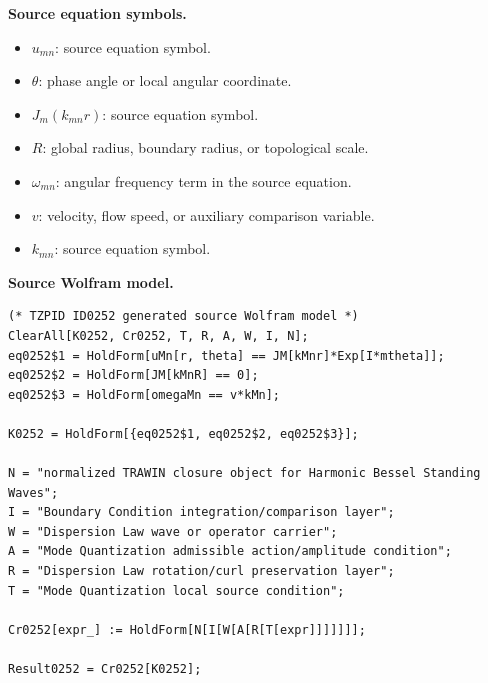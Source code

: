 \begin{minipage}[t]{0.49\linewidth}
\begingroup
\small
\raggedright
\textbf{Source equation symbols.}\par
\begin{itemize}[leftmargin=1.35em,itemsep=1pt,topsep=1pt,parsep=0pt]
    \item $u_{mn}$: source equation symbol.
    \item $\theta$: phase angle or local angular coordinate.
    \item $J_m(k_{mn}r)$: source equation symbol.
    \item $R$: global radius, boundary radius, or topological scale.
    \item $\omega_{mn}$: angular frequency term in the source equation.
    \item $v$: velocity, flow speed, or auxiliary comparison variable.
    \item $k_{mn}$: source equation symbol.
\end{itemize}
\endgroup
\end{minipage}\hfill
\begin{minipage}[t]{0.47\linewidth}
\begingroup
\scriptsize
\raggedright
\textbf{Source Wolfram model.}\par
\begin{Verbatim}[fontsize=\tiny,breaklines=true,breakanywhere=true]
(* TZPID ID0252 generated source Wolfram model *)
ClearAll[K0252, Cr0252, T, R, A, W, I, N];
eq0252$1 = HoldForm[uMn[r, theta] == JM[kMnr]*Exp[I*mtheta]];
eq0252$2 = HoldForm[JM[kMnR] == 0];
eq0252$3 = HoldForm[omegaMn == v*kMn];

K0252 = HoldForm[{eq0252$1, eq0252$2, eq0252$3}];

N = "normalized TRAWIN closure object for Harmonic Bessel Standing Waves";
I = "Boundary Condition integration/comparison layer";
W = "Dispersion Law wave or operator carrier";
A = "Mode Quantization admissible action/amplitude condition";
R = "Dispersion Law rotation/curl preservation layer";
T = "Mode Quantization local source condition";

Cr0252[expr_] := HoldForm[N[I[W[A[R[T[expr]]]]]]];

Result0252 = Cr0252[K0252];
\end{Verbatim}
\endgroup
\end{minipage}

